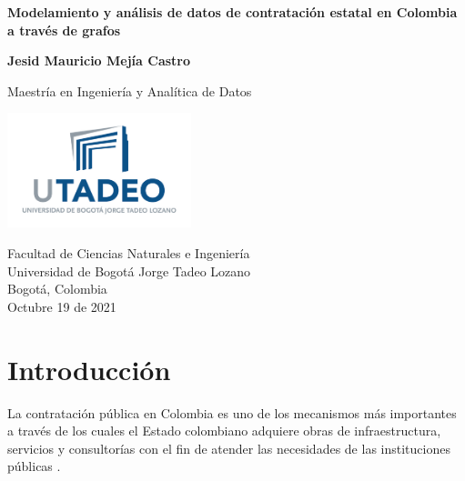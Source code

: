 \documentclass[11pt,letterpaper,oneside]{article}
\author{Jesid Mauricio Mejía Castro}
\begin{document}
	
	
	\begin{titlepage}
	   \begin{center}
	       \vspace*{1cm}
	
	       \textbf{Modelamiento y análisis de datos de contratación estatal en Colombia a través de grafos}
	
	       \vspace{0.5cm}
	            
	       \vspace{1.5cm} 
	
	       \textbf{Jesid Mauricio Mejía Castro}
	
	       \vspace{9.5cm}
	            
	       Maestría en Ingeniería y Analítica de Datos
	            
	       \vspace{0.4cm}
	     
	       \includegraphics[width=0.4\textwidth]{logo-utadeo-vert.jpg}
	            
	       Facultad de Ciencias Naturales e Ingeniería\\
	       Universidad de Bogotá Jorge Tadeo Lozano\\
	       Bogotá, Colombia\\
	       Octubre 19 de 2021
	            
	   \end{center}
	\end{titlepage}
	
	\tableofcontents
	\newpage
	
	\section{Introducción}
	La contratación pública en Colombia es uno de los mecanismos más importantes a través de los cuales el Estado colombiano adquiere obras de infraestructura, servicios y consultorías con el fin de atender las necesidades de las instituciones públicas \cite{Angarita-2018}.
	
\end{document}
